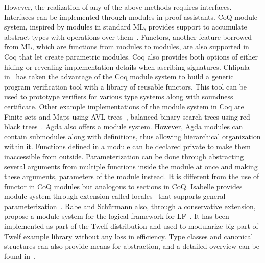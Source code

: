 However, the realization of any of the above methods requires interfaces. Interfaces can be implemented through modules in proof assistants. CoQ module system, inspired by modules in standard ML, provides support to accumulate abstract types with operations over them~\cite{Chlipala_CPDT_2013}. Functors, another feature borrowed from ML, which are functions from modules to modules, are also supported in Coq that let create parametric modules. Coq also provides both options of either hiding or revealing implementation details when ascribing signatures. Chlipala in~\cite{Chlipala_2008} has taken the advantage of the Coq module system to build a generic program verification tool with a library of reusable functors. This tool can be used to prototype verifiers for various type systems along with soundness certificate. Other example implementations of the module system in Coq are Finite sets and Maps using AVL trees~\cite {Filliatre_et_al_2004}, balanced binary search trees using red-black trees~\cite{Appel_2011}. Agda also offers a module system. However, Agda modules can contain submodules along with definitions, thus allowing hierarchical organization within it. Functions defined in a module can be declared private to make them inaccessible from outside. Parameterization can be done through abstracting several arguments from multiple functions inside the module at once and making these arguments, parameters of the module instead. It is different from the use of functor in CoQ modules but analogous to sections in CoQ. Isabelle provides module system through extension called locales~\cite{Ballarin_2004, Kammuller_1999} that supports general parameterization~\cite{Ballarin_2010}. Rabe and Sch\"{u}rmann also, through a conservative extension, propose a module system for the logical framework for LF~\cite{Rabe_et_al_2009}. It has been implemented as part of the Twelf distribution and used to modularize big part of Twelf example library without any loss in efficiency. Type classes and canonical structures can also provide means for abstraction, and a detailed overview can be found in~\cite{Ringer_et_al_2019}. 

